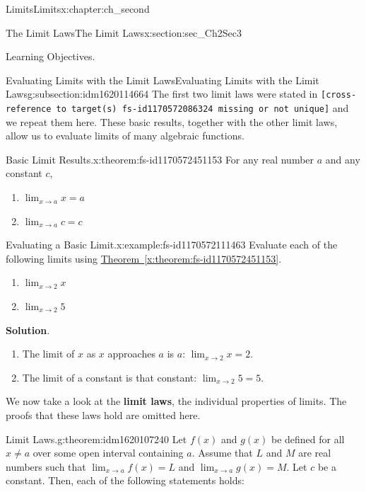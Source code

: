 \documentclass[oneside,10pt,]{book}
\newcommand{\blocktitlefont}{\relax}
\newcommand{\xreffont}{\relax}
\newcommand{\mono}[1]{\texttt{#1}}
\newcommand{\terminology}[1]{\textbf{#1}}
\numberwithin{equation}{section}
\begin{document}
\begin{chapterptx}{Limits}{}{Limits}{}{}{x:chapter:ch_second}
\begin{sectionptx}{The Limit Laws}{}{The Limit Laws}{}{}{x:section:sec_Ch2Sec3}
\begin{introduction}{Learning Objectives.}
\end{introduction}%
%
%
\typeout{************************************************}
\typeout{************************************************}
%
\begin{subsectionptx}{Evaluating Limits with the Limit Laws}{}{Evaluating Limits with the Limit Laws}{}{}{g:subsection:idm1620114664}
The first two limit laws were stated in \mono{[cross-reference to target(s) \textquotedbl{}fs-id1170572086324\textquotedbl{} missing or not unique]} and we repeat them here. These basic results, together with the other limit laws, allow us to evaluate limits of many algebraic functions.%
\begin{theorem}{Basic Limit Results.}{}{x:theorem:fs-id1170572451153}%
For any real number \(a\) and any constant \(c\),%
%
\begin{enumerate}[label=(\roman*)]
\item{}\(\displaystyle \lim_{x \to a }x=a\)%
\item{}\(\displaystyle \lim_{x \to a }c=c\)%
\end{enumerate}
\end{theorem}
\begin{example}{Evaluating a Basic Limit.}{x:example:fs-id1170572111463}%
Evaluate each of the following limits using \hyperref[x:theorem:fs-id1170572451153]{Theorem~{\xreffont\ref{x:theorem:fs-id1170572451153}}}.%
%
\begin{enumerate}[label=(\alph*)]
\item{}\(\displaystyle \lim_{x \to 2 }x\)%
\item{}\(\displaystyle \lim_{x \to 2 }5\)%
\end{enumerate}
\par\smallskip%
\noindent\textbf{\blocktitlefont Solution}.\hypertarget{g:solution:idm1620112232}{}\quad{}%
\begin{enumerate}[label=(\alph*)]
\item{}The limit of \(x\) as \(x\) approaches \(a\) is \(a\): \(\lim_{x \to 2 }x=2.\)%
\item{}The limit of a constant is that constant: \(\lim_{x \to 2 }5=5.\)%
\end{enumerate}
\end{example}
We now take a look at the \terminology{limit laws}, the individual properties of limits. The proofs that these laws hold are omitted here.%
\begin{theorem}{Limit Laws.}{}{g:theorem:idm1620107240}%
Let \(f(x)\) and \(g(x)\) be defined for all \(x\neq a\) over some open interval containing \(a\). Assume that \(L \) and \(M \) are real numbers such that \(\lim_{x \to a }f(x)=L\) and \(\lim_{x \to a }g(x)=M.\) Let \(c\) be a constant. Then, each of the following statements holds:%

\end{theorem}
\end{subsectionptx}
\end{sectionptx}
\end{chapterptx}
\end{document}
